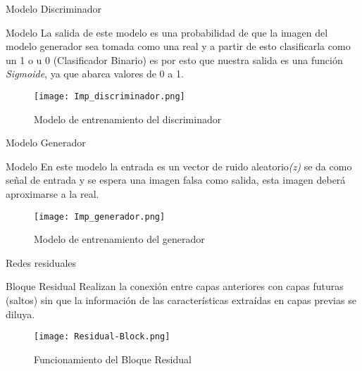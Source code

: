 \begin{frame}{Modelo Discriminador}
    
    \begin{block}{Modelo}
        La salida de este modelo es una probabilidad de que la imagen del modelo generador sea tomada
        como una real y a partir de esto clasificarla como un 1 o u 0 (Clasificador Binario) es por esto que nuestra salida es una función 
        \emph{Sigmoide}, ya que abarca valores de 0 a 1.
    \end{block}  
    \begin{figure}[H]
        \begin{center}
          \texttt{[image: Imp\_discriminador.png]}
          \caption{Modelo de entrenamiento del discriminador}
          \label{Alexis3}
        \end{center}
    \end{figure}
     

\end{frame}

\begin{frame}{Modelo Generador}
    
    \begin{block}{Modelo}
        En este modelo la entrada es un vector de ruido aleatorio\emph{(z)} se da como señal de entrada 
        y se espera una imagen falsa como salida, esta imagen deberá aproximarse a la real.
    \end{block} 
        
    \begin{figure}[H]
        \begin{center}
          \texttt{[image: Imp\_generador.png]}
          \caption{Modelo de entrenamiento del generador}
          \label{Alexis4}
        \end{center}
    \end{figure}
     

\end{frame}



\begin{frame}{Redes residuales}
    \begin{block}{Bloque Residual}
        Realizan la conexión entre capas anteriores con capas futuras (saltos) sin que la información de 
        las características extraídas en capas previas se diluya.
    \end{block}
    \begin{figure}[H]
        \begin{center}
          \texttt{[image: Residual-Block.png]}
          \caption{Funcionamiento del Bloque Residual}
          \label{Alexis10}
        \end{center}
    \end{figure}

\end{frame}


